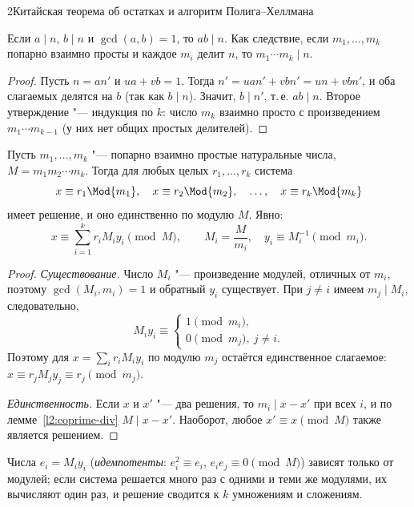 \begin{lecture}{2}{Китайская теорема об остатках и алгоритм Полига–Хеллмана}
\begin{lemma}\label{l2:coprime-div}
Если $a \mid n$, $b \mid n$ и $\gcd(a, b) = 1$, то $ab \mid n$. Как следствие, если
$m_1, \dots, m_k$ попарно взаимно просты и каждое $m_i$ делит $n$, то $m_1 \cdots m_k \mid n$.
\end{lemma}

\begin{proof}
Пусть $n = a n'$ и $ua + vb = 1$. Тогда $n' = u a n' + v b n' = u n + v b n'$, и оба слагаемых
делятся на $b$ (так как $b \mid n$). Значит, $b \mid n'$, т.\,е. $ab \mid n$. Второе утверждение
"--- индукция по $k$: число $m_k$ взаимно просто с произведением $m_1 \cdots m_{k-1}$ (у них нет
общих простых делителей).
\end{proof}

\begin{theorem}\label{l2:crt}
Пусть $m_1, \dots, m_k$ "--- попарно взаимно простые натуральные числа, $M = m_1 m_2 \cdots m_k$.
Тогда для любых целых $r_1, \dots, r_k$ система
\[
  x \equiv r_1 \Mod{m_1}, \quad x \equiv r_2 \Mod{m_2}, \quad \dots, \quad x \equiv r_k \Mod{m_k}
\]
имеет решение, и оно единственно по модулю $M$. Явно:
\[
  x \equiv \sum_{i=1}^{k} r_i M_i y_i \pmod M, \qquad M_i = \frac{M}{m_i}, \quad
  y_i \equiv M_i^{-1} \pmod{m_i}.
\]
\end{theorem}

\begin{proof}
\emph{Существование.} Число $M_i$ "--- произведение модулей, отличных от $m_i$, поэтому
$\gcd(M_i, m_i) = 1$ и обратный $y_i$ существует. При $j \ne i$ имеем $m_j \mid M_i$, следовательно,
\[
  M_i y_i \equiv \begin{cases} 1 \pmod{m_i},\\ 0 \pmod{m_j},\ j \ne i.\end{cases}
\]
Поэтому для $x = \sum_i r_i M_i y_i$ по модулю $m_j$ остаётся единственное слагаемое:
$x \equiv r_j M_j y_j \equiv r_j \pmod{m_j}$.

\emph{Единственность.} Если $x$ и $x'$ "--- два решения, то $m_i \mid x - x'$ при всех $i$,
и по лемме~\ref{l2:coprime-div} $M \mid x - x'$. Наоборот, любое $x' \equiv x \pmod M$ также
является решением.
\end{proof}

Числа $e_i = M_i y_i$ (\emph{идемпотенты}: $e_i^2 \equiv e_i$, $e_i e_j \equiv 0 \pmod M$)
зависят только от модулей; если система решается много раз с одними и теми же модулями, их
вычисляют один раз, и решение сводится к $k$ умножениям и сложениям.


\end{lecture}

